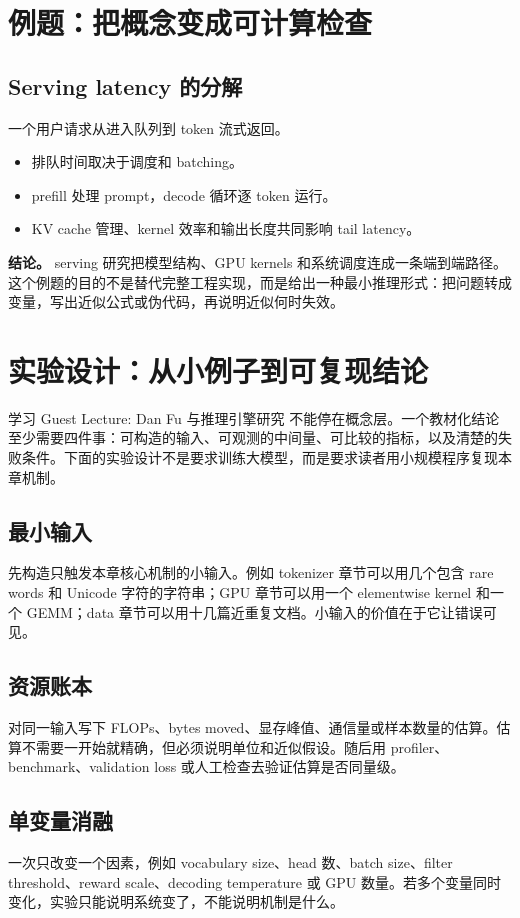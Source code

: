 \documentclass[a4paper]{article}
\begin{document}
\section{例题：把概念变成可计算检查}
\subsection{Serving latency 的分解}
一个用户请求从进入队列到 token 流式返回。
\begin{itemize}
\item 排队时间取决于调度和 batching。
\item prefill 处理 prompt，decode 循环逐 token 运行。
\item KV cache 管理、kernel 效率和输出长度共同影响 tail latency。
\end{itemize}
\textbf{结论。} serving 研究把模型结构、GPU kernels 和系统调度连成一条端到端路径。
这个例题的目的不是替代完整工程实现，而是给出一种最小推理形式：把问题转成变量，写出近似公式或伪代码，再说明近似何时失效。
\section{实验设计：从小例子到可复现结论}
学习 Guest Lecture: Dan Fu 与推理引擎研究 不能停在概念层。一个教材化结论至少需要四件事：可构造的输入、可观测的中间量、可比较的指标，以及清楚的失败条件。下面的实验设计不是要求训练大模型，而是要求读者用小规模程序复现本章机制。
\subsection{最小输入}
先构造只触发本章核心机制的小输入。例如 tokenizer 章节可以用几个包含 rare words 和 Unicode 字符的字符串；GPU 章节可以用一个 elementwise kernel 和一个 GEMM；data 章节可以用十几篇近重复文档。小输入的价值在于它让错误可见。
\subsection{资源账本}
对同一输入写下 FLOPs、bytes moved、显存峰值、通信量或样本数量的估算。估算不需要一开始就精确，但必须说明单位和近似假设。随后用 profiler、benchmark、validation loss 或人工检查去验证估算是否同量级。
\subsection{单变量消融}
一次只改变一个因素，例如 vocabulary size、head 数、batch size、filter threshold、reward scale、decoding temperature 或 GPU 数量。若多个变量同时变化，实验只能说明系统变了，不能说明机制是什么。
\end{document}
